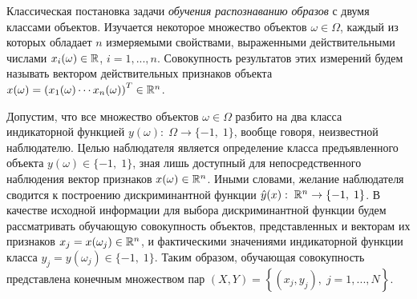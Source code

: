 \begin{remark}
Классическая постановка задачи \textit{обучения распознаванию образов} с двумя классами объектов. Изучается некоторое множество объектов $\omega \in \Omega $, каждый из которых обладает $n$ измеряемыми свойствами, выраженными действительными числами $x_{i} (\omega )\in {\rm {\mathbb R}}$, $i=1,...,n$. Совокупность результатов этих измерений будем называть вектором действительных признаков объекта $x(\omega )=\left(x_{1} (\omega )\cdots x_{n} (\omega )\right)^{T} \in {\rm {\mathbb R}}^{n} $. \underbar{}

Допустим, что все множество объектов $\omega \in \Omega $ разбито на два класса индикаторной функцией $y(\omega ):\; \Omega \to \{ -1,\; 1\} $, вообще говоря, неизвестной наблюдателю. Целью наблюдателя является определение класса предъявленного объекта $y(\omega )\in \{ -1,\; 1\} $, зная лишь доступный для непосредственного наблюдения вектор признаков $x(\omega )\in {\rm {\mathbb R}}^{n} $. Иными словами, желание наблюдателя сводится к построению дискриминантной функции $\hat{y}(x):\; {\rm {\mathbb R}}^{n} \to \{ -1,\; 1\} $. В качестве исходной информации для выбора дискриминантной функции будем рассматривать обучающую совокупность объектов, представленных и векторам их признаков $x_{j} =x(\omega _{j} )\in {\rm {\mathbb R}}^{n} $, и фактическими значениями индикаторной функции класса $y_{j} =y(\omega _{j} )\in \{ -1,\; 1\} $. Таким образом, обучающая совокупность представлена конечным множеством пар $(X,Y)=\left\{(x_{j} ,y_{j} ),\; j=1,...,N\right\}$. 
\end{remark}



